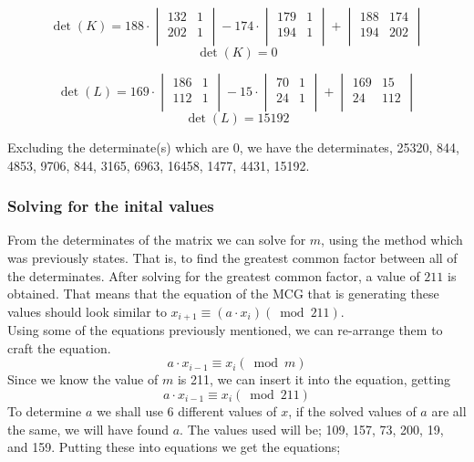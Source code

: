 \documentclass[12pft, english]{article}
\begin{document}
\begin{multicols}{2}
  \[
    \det(K) =
    188 \cdot
    \begin{vmatrix}
      132 & 1 \\
      202 & 1 \\
    \end{vmatrix}
    -
    174 \cdot
    \begin{vmatrix}
      179 & 1 \\
      194 & 1 \\
    \end{vmatrix}
    +
    \begin{vmatrix}
      188 & 174 \\
      194 & 202 \\
    \end{vmatrix}
  \]
  \[
    \det(K) = 0
  \]

  \[
    \det(L) =
    169 \cdot
    \begin{vmatrix}
      186 & 1 \\
      112 & 1 \\
    \end{vmatrix}
    -
    15 \cdot
    \begin{vmatrix}
      70 & 1 \\
      24 & 1 \\
    \end{vmatrix}
    +
    \begin{vmatrix}
      169 & 15 \\
      24 & 112 \\
    \end{vmatrix}
  \]
  \[
    \det(L) = 15192
  \]

  Excluding the determinate(s) which are 0, we have the determinates, 25320, 844, 4853, 9706, 844, 3165, 6963, 16458, 1477, 4431, 15192.

  \subsubsection{Solving for the inital values}

  From the determinates of the matrix we can solve for \(m\), using the method which was previously states. That is, to find the greatest common factor between all of the determinates. After solving for the greatest common factor, a value of \(211\) is obtained. That means that the equation of the MCG that is generating these values should look similar to \(x_{i+1} \equiv (a \cdot x_{i}) (\bmod {211})\). \\
  Using some of the equations previously mentioned, we can re-arrange them to craft the equation. \cite{reteamHal}
  \[ a \cdot x_{i - 1} \equiv x_{i} ( \bmod m )\]
  Since we know the value of \(m\) is 211, we can insert it into the equation, getting
  \[a \cdot x_{i-1} \equiv x_{i} (\bmod 211)\]
  To determine \(a\) we shall use 6 different values of \(x\), if the solved values of \(a\) are all the same, we will have found \(a\). The values used will be; 109, 157, 73, 200, 19, and 159. Putting these into equations we get the equations;


\end{multicols}
\end{document}
